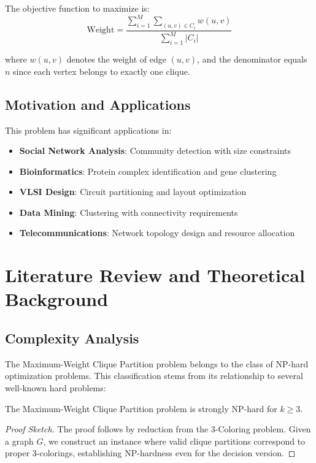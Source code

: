 \documentclass[12pt,a4paper]{article}
\begin{document}
The objective function to maximize is:
\begin{equation}
\text{Weight} = \frac{\sum_{i=1}^M \sum_{(u, v) \in C_i} w(u, v)}{\sum_{i=1}^M |C_i|}
\end{equation}

where $w(u, v)$ denotes the weight of edge $(u, v)$, and the denominator equals $n$ since each vertex belongs to exactly one clique.

\subsection{Motivation and Applications}

This problem has significant applications in:
\begin{itemize}
    \item \textbf{Social Network Analysis}: Community detection with size constraints
    \item \textbf{Bioinformatics}: Protein complex identification and gene clustering
    \item \textbf{VLSI Design}: Circuit partitioning and layout optimization
    \item \textbf{Data Mining}: Clustering with connectivity requirements
    \item \textbf{Telecommunications}: Network topology design and resource allocation
\end{itemize}

\section{Literature Review and Theoretical Background}

\subsection{Complexity Analysis}

The Maximum-Weight Clique Partition problem belongs to the class of NP-hard optimization problems. This classification stems from its relationship to several well-known hard problems:

\begin{theorem}[NP-Hardness]
The Maximum-Weight Clique Partition problem is strongly NP-hard for $k \geq 3$.
\end{theorem}

\begin{proof}[Proof Sketch]
The proof follows by reduction from the 3-Coloring problem. Given a graph $G$, we construct an instance where valid clique partitions correspond to proper 3-colorings, establishing NP-hardness even for the decision version.
\end{proof}
\end{document}
